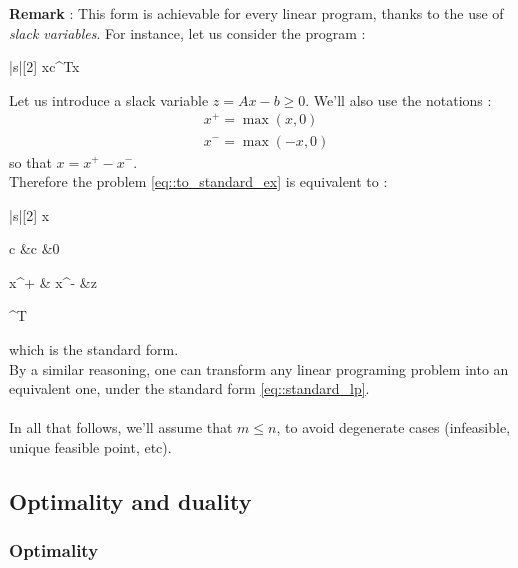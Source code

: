 \documentclass[a4paper]{article}
\begin{document}
{{			\begin{leftbar}
				\noindent \sffamily 
				\textbf{Remark} : This form is achievable for every linear program, thanks to the use of \emph{slack variables}. For instance, let us consider the program : 
				\begin{mini}|s|[2]
					{x}{c^Tx}
					{\label{eq::to_standard_ex}}{}
				\end{mini}
				Let us introduce a slack variable $z = Ax-b\geq0$. We'll also use the notations : 
				$$
					\begin{aligned}
						&x^+ = \max{(x,0)} \\
						&x^- = \max{(-x,0)}
					\end{aligned}
				$$
					so that $x = x^+ - x^-$. \\
					Therefore the problem \eqref{eq::to_standard_ex} is equivalent to : 
			\begin{mini}|s|[2]
				{x}{\begin{pmatrix} c &c &0 \end{pmatrix} \begin{pmatrix} x^+ & x^- &z\end{pmatrix}^T}
				{}{}
				\addConstraint{\begin{pmatrix} A &-A &I \end{pmatrix}\begin{pmatrix} x^+ \\ x^- \\ z\end{pmatrix}}{=b}
				\addConstraint{x^+,x^-,z}{\geq 0}
			\end{mini}
			which is the standard form. \\
			By a similar reasoning, one can transform any linear programing problem into an equivalent one, under the standard form \eqref{eq::standard_lp}.
			\end{leftbar}
			
			\paragraph{} In all that follows, we'll assume that $m\leq n$, to avoid degenerate cases (infeasible, unique feasible point, etc). 
		}
		
		\subsection{Optimality and duality}
		{
			\subsubsection{Optimality}
			{
}}}
\end{document}
